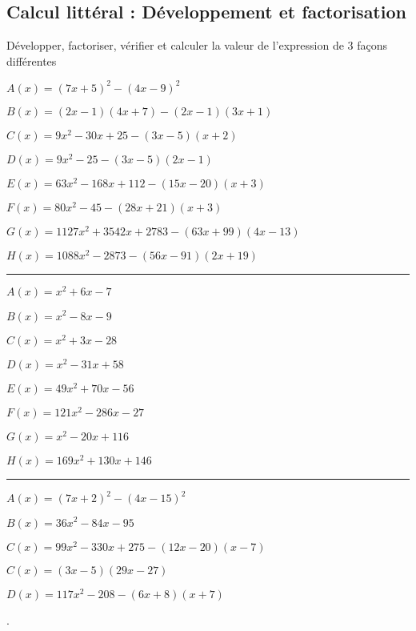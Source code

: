 \ifdefined\COMPLETE
\else
    
    \usepackage{setspace}
    
    
   \thispagestyle{empty} 
\fi

 
\begin{spacing}{2} 

\section*{Calcul littéral : Développement et factorisation}

 Développer, factoriser, vérifier  et calculer la valeur de l'expression  de 3 façons différentes

$ A(x) = \left(7x + 5\right)^2 - \left(4x-9\right)^2 $ 


$ B(x) = \left(2x-1\right)\left(4x+7\right) - \left(2x-1\right)\left(3x+1\right) $ 



$ C(x) = 9x^2-30x+25-\left(3x-5\right)\left(x+2\right) $



$ D(x) = 9x^2-25-\left(3x-5\right)\left(2x-1\right) $



$ E(x) = 63x^2-168x+112-\left(15x-20\right)\left(x+3\right) $



$ F(x) = 80x^2-45-\left(28x+21\right)\left(x+3\right) $



$ G(x) = 1127x^2 + 3542x + 2783 - \left(63x + 99\right)\left(4x-13\right) $



$ H(x) = 1088x^2 - 2873 - \left(56x-91\right)\left(2x+19\right) $

\bigskip \hrule  \bigskip


$ A(x) = x^2 + 6x - 7 $


$ B(x) = x^2 - 8x - 9 $

$ C(x) = x^2 + 3x - 28 $


$ D(x) = x^2 - 31x + 58 $



$ E(x) = 49x^2+70x-56 $



$ F(x) = 121x^2 - 286x - 27 $



$ G(x) = x^2 - 20x + 116 $


$ H(x) = 169x^2+130x+146 $

\bigskip \hrule  \bigskip

$ A(x) = \left(7x+2\right)^2-\left(4x-15\right)^2 $



$ B(x) = 36x^2-84x-95 $

$ C(x) = 99x^2 - 330x + 275 - \left(12x-20\right)\left(x-7\right) $


$ C(x) = \left(3x-5\right)\left(29x-27\right) $ 

$ D(x) = 117x^2 - 208 - \left(6x+8\right)\left(x+7\right)$ 

\end{spacing}. 

\ifdefined\COMPLETE
\else
    
\fi